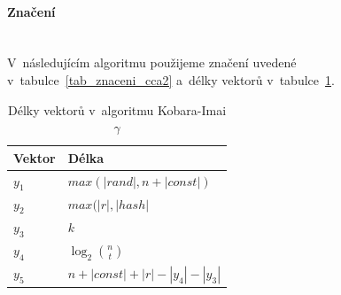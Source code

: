 \documentclass[thesis=M,czech,hidelinks]{FITthesis}[2012/06/26]
\newcommand{\0}{{\textcolor[gray]{0.75}{0}}}
\begin{document}
\paragraph{Značení} \hfil \\
V~následujícím algoritmu použijeme značení uvedené
v~tabulce~\ref{tab_znaceni_cca2} a~délky vektorů v~tabulce~\ref{tab_delky_cca2}.

\vfil

\begin{table}[!ht]
    \centering
    \begin{tabular}{l l}
        Vektor      & Délka                                 \\
        \hline
        $y_1$       & $max(|rand|, n+|const|)$              \\
        $y_2$       & $max(|r|,|hash|$                      \\
        $y_3$       & $k$                                   \\
        $y_4$       & $\log_2 \binom{n}{t}$                 \\
        $y_5$       & $n + |const| + |r| - |y_4| - |y_3|$   \\
    \end{tabular}
    \caption[Délky vektorů v~CCA2 odolné konverzi $\gamma$]{
        Délky vektorů v~algoritmu Kobara-Imai $\gamma$
    }
    \label{tab_delky_cca2}
\end{table}
\end{document}
